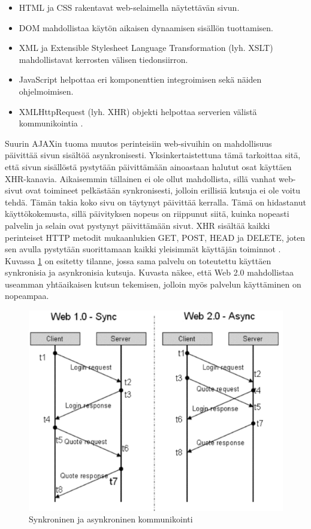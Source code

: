 \begin{itemize}
\item HTML ja CSS rakentavat web-selaimella näytettävän sivun.
\item DOM mahdollistaa käytön aikaisen dynaamisen sisällön tuottamisen.
\item XML ja Extensible Stylesheet Language Transformation (lyh. XSLT) mahdollistavat kerrosten välisen tiedonsiirron.
\item JavaScript helpottaa eri komponenttien integroimisen sekä näiden ohjelmoimisen.
\item XMLHttpRequest (lyh. XHR) objekti helpottaa serverien välistä kommunikointia \cite{WEB2b}.
\end{itemize}

Suurin AJAXin tuoma muutos perinteisiin web-sivuihin on mahdollisuus päivittää sivun sisältöä asynkronisesti. Yksinkertaistettuna tämä tarkoittaa sitä, että sivun sisällöstä
pystytään päivittämään ainoastaan halutut osat käyttäen XHR-kanavia. Aikaisemmin tällainen ei ole ollut mahdollista, sillä vanhat web-sivut ovat toimineet pelkästään synkronisesti, jolloin 
erillisiä kutsuja ei ole voitu tehdä. Tämän takia koko sivu on täytynyt päivittää kerralla. Tämä on hidastanut käyttökokemusta, sillä päivityksen nopeus on riippunut siitä, 
kuinka nopeasti palvelin ja selain ovat pystynyt päivittämään sivut. XHR sisältää kaikki perinteiset HTTP metodit mukaanlukien GET, POST, HEAD ja DELETE, joten sen avulla pystytään suorittamaan
kaikki yleisimmät käyttäjän toiminnot \cite{WEB2}. Kuvassa \ref{synkroninen} on esitetty tilanne, jossa sama palvelu on toteutettu käyttäen synkronisia ja asynkronisia 
kutsuja. Kuvasta näkee, että Web 2.0 mahdollistaa useamman yhtäaikaisen kutsun tekemisen, jolloin myös palvelun käyttäminen on nopeampaa.

\begin{figure}[htp]
\centering
\includegraphics[width=12cm]{pics/synkroninen.pdf}
\caption{Synkroninen ja asynkroninen kommunikointi}
\label{synkroninen}
\end{figure}

